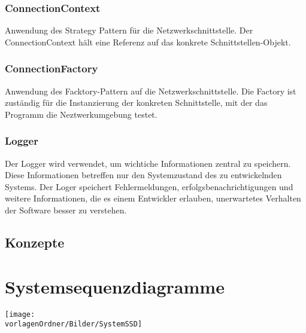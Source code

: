 \documentclass[
	ngerman,
	toc=listof, %
	toc=bibliography, %
	footnotes=multiple, %
	parskip=half, %
	numbers=noendperiod %
]{scrartcl}
\newcommand{\vorlagenOrdner}{../../99_Vorlagen} %
\begin{document}
	\subsubsection{ConnectionContext}
	Anwendung des Strategy Pattern für die Netzwerkschnittstelle. 
	Der ConnectionContext hält eine Referenz auf das konkrete Schnittstellen-Objekt.

	\subsubsection{ConnectionFactory}
	Anwendung des Facktory-Pattern auf die Netzwerkschnittstelle.
	Die Factory ist zuständig für die Instanzierung der konkreten Schnittstelle, mit der das Programm die Neztwerkumgebung testet.

	\subsubsection{Logger}
	Der Logger wird verwendet, um wichtiche Informationen zentral zu speichern. 
	Diese Informationen betreffen nur den Systemzustand des zu entwickelnden Systems.
	Der Loger speichert Fehlermeldungen, erfolgsbenachrichtigungen und weitere Informationen, die es einem Entwickler erlauben, unerwartetes Verhalten der Software besser zu verstehen.
	

	\subsection{Konzepte}

\section{Systemsequenzdiagramme}
	\texttt{[image: \\vorlagenOrdner/Bilder/SystemSSD]}
\end{document}
